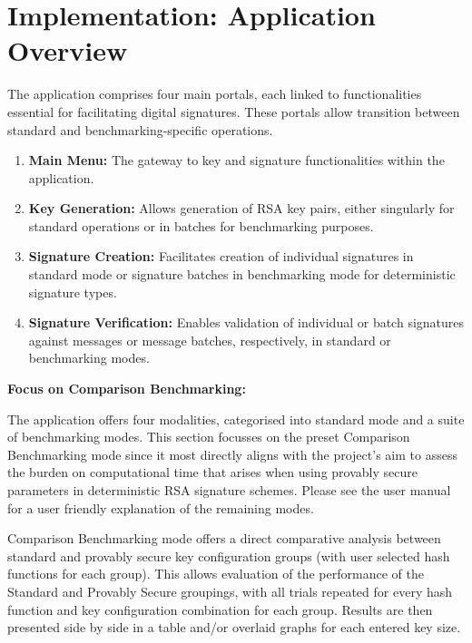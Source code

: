 \documentclass[]{final_report}
\theoremstyle{definition}
\begin{document}
\section{Implementation: Application Overview}
The application comprises four main portals, each linked to functionalities essential for facilitating digital signatures. These portals allow transition between standard and benchmarking-specific operations.
\begin{enumerate}
    \item \textbf{Main Menu:} The gateway to key and signature functionalities within the application.
    \item \textbf{Key Generation:} Allows generation of RSA key pairs, either singularly for standard operations or in batches for benchmarking purposes.
    \item \textbf{Signature Creation:} Facilitates creation of individual signatures in standard mode or signature batches in benchmarking mode for deterministic signature types.
    \item \textbf{Signature Verification:} Enables validation of individual or batch signatures against messages or message batches, respectively, in standard or benchmarking modes.
\end{enumerate}


\textbf{Focus on Comparison Benchmarking:}

The application offers four modalities, categorised into standard mode and a suite of benchmarking modes. This section focusses on the preset Comparison Benchmarking mode since it most directly aligns with the project's aim to assess the burden on computational time that arises when using provably secure parameters in deterministic RSA signature schemes. Please see the user manual for a user friendly explanation of the remaining modes.


Comparison Benchmarking mode offers a direct comparative analysis between standard and provably secure key configuration groups (with user selected hash functions for each group). This allows evaluation of the performance of the Standard and Provably Secure groupings, with all trials repeated for every hash function and key configuration combination for each group. Results are then presented side by side in a table and/or overlaid graphs for each entered key size.
\end{document}

